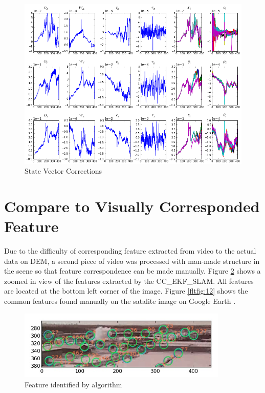 \begin{figure}[h]
\centering
\includegraphics[width=12cm, keepaspectratio=true]
{./Figures/fltfig/cut1/Figure112.png}
\caption{State Vector Corrections}
\label{fltfig:4}
\end{figure}

\FloatBarrier

\section{Compare to Visually Corresponded Feature}
Due to the difficulty of corresponding feature extracted from video to the
actual data on DEM, a second piece of video was processed with
man-made structure in the scene so that feature correspondence can be
made manually. Figure \ref{fltfig:11} shows a zoomed in view of the
features extracted by the CC\_EKF\_SLAM. All features are located at
the bottom left corner of the image. Figure \ref{fltfig:12} shows the
common features found manually on the satalite image on Google Earth
\cite{_google_????}.

\begin{figure}[h]
\centering
\includegraphics[width=10cm, keepaspectratio=true]
{./Figures/fltfig/airport/frame398_features.jpg}
\caption{Feature identified by algorithm }
\label{fltfig:11}
\end{figure}


